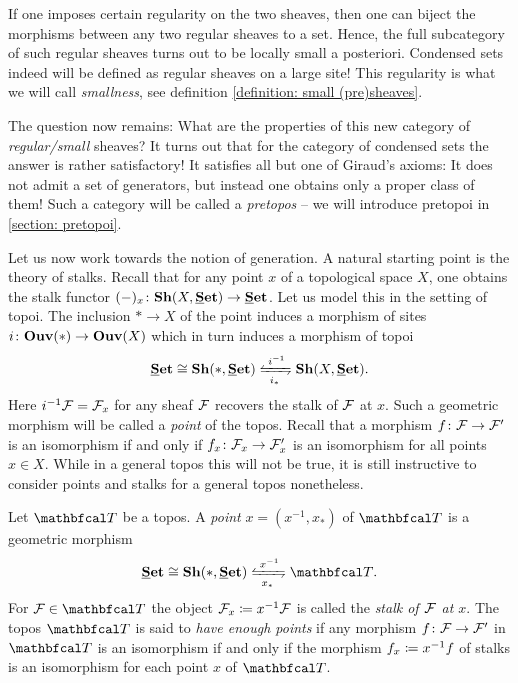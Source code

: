 If one imposes certain regularity on the two sheaves, then one can biject the morphisms between any two regular sheaves to a set. Hence, the full subcategory of such regular sheaves turns out to be locally small a posteriori. Condensed sets indeed will be defined as regular sheaves on a large site! This regularity is what we will call \emph{smallness}, see definition \ref{definition: small (pre)sheaves}.

The question now remains: What are the properties of this new category of \emph{regular/small} sheaves? It turns out that for the category of condensed sets the answer is rather satisfactory! It satisfies all but one of Giraud's axioms: It does not admit a set of generators, but instead one obtains only a proper class of them! Such a category will be called a \emph{pretopos} -- we will introduce pretopoi in \ref{section: pretopoi}. 

Let us now work towards the notion of generation. A natural starting point is the theory of stalks. Recall that for any point $x$ of a topological space $X$, one obtains the stalk functor $(-)_x\colon \Sheaves{X}\Set\to \Set$. Let us model this in the setting of topoi. The inclusion $\ast \to X$ of the point induces a morphism of sites $i\colon{{\mathbf{Ouv}}(\ast)} \to {{\mathbf{Ouv}}(X)}$ which in turn induces a morphism of topoi $$\Set \iso \Sheaves{\ast}{\Set} \xleftrightarrows{i^{-1}}{i_\ast} \Sheaves{X}{\Set}.$$
Here $i^{-1}{\mathcal{F}} = {\mathcal{F}}_x$ for any sheaf ${\mathcal{F}}$ recovers the stalk of ${\mathcal{F}}$ at $x$. Such a geometric morphism will be called a \emph{point} of the topos. Recall that a morphism $f\colon {\mathcal{F}}\to{\mathcal{F}}'$ is an isomorphism if and only if $f_x\colon {\mathcal{F}}_x\to{\mathcal{F}}'_x$ is an isomorphism for all points $x\in X$. While in a general topos this will not be true, it is still instructive to consider points and stalks for a general topos nonetheless.
\begin{definition}
	\label{definition: points in a topos}
	
	Let $\category T$ be a topos. A \emph{point} $x=(x^{-1}, x_\ast)$ of $\category T$ is a geometric morphism
		$$\Set\iso \Sheaves \ast \Set \xleftrightarrows{x^{-1}}{x_\ast}\category T.$$
	For $\sheaf F\in \category T$ the object ${\mathcal{F}}_x \coloneqq x^{-1}{\mathcal{F}}$ is called the \emph{stalk of ${\mathcal{F}}$ at $x$}. The topos $\category T$ is said to \emph{have enough points} if any morphism $f\colon {\mathcal{F}}\to {\mathcal{F}}'$ in $\category T$ is an isomorphism if and only if the morphism $f_x\coloneqq x^{-1}f$ of stalks is an isomorphism for each point $x$ of $\category T$.
\end{definition}

